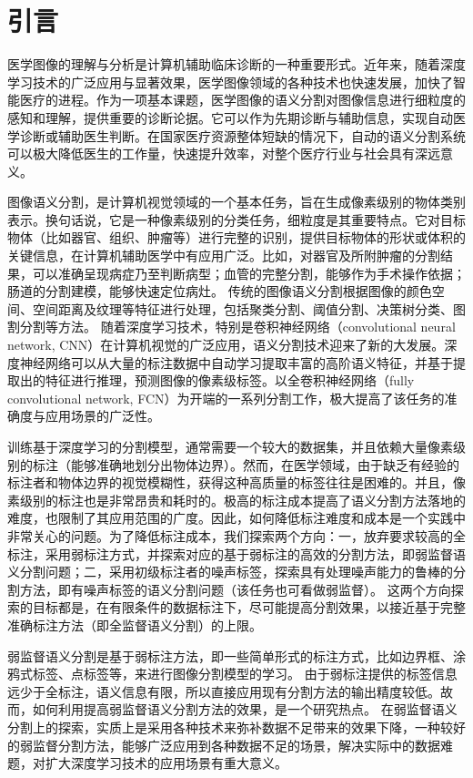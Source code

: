 \chapter{引言}

医学图像的理解与分析是计算机辅助临床诊断的一种重要形式。近年来，随着深度学习技术的广泛应用与显著效果，医学图像领域的各种技术也快速发展，加快了智能医疗的进程。作为一项基本课题，医学图像的语义分割对图像信息进行细粒度的感知和理解，提供重要的诊断论据。它可以作为先期诊断与辅助信息，实现自动医学诊断或辅助医生判断。在国家医疗资源整体短缺的情况下，自动的语义分割系统可以极大降低医生的工作量，快速提升效率，对整个医疗行业与社会具有深远意义。

图像语义分割，是计算机视觉领域的一个基本任务，旨在生成像素级别的物体类别表示。换句话说，它是一种像素级别的分类任务，细粒度是其重要特点。它对目标物体（比如器官、组织、肿瘤等）进行完整的识别，提供目标物体的形状或体积的关键信息，在计算机辅助医学中有应用广泛。比如，对器官及所附肿瘤的分割结果，可以准确呈现病症乃至判断病型；血管的完整分割，能够作为手术操作依据；肠道的分割建模，能够快速定位病灶。
传统的图像语义分割根据图像的颜色空间、空间距离及纹理等特征进行处理，包括聚类分割、阈值分割、决策树分类、图割分割等方法。
随着深度学习技术，特别是卷积神经网络（convolutional neural network, CNN）在计算机视觉的广泛应用，语义分割技术迎来了新的大发展。深度神经网络可以从大量的标注数据中自动学习提取丰富的高阶语义特征，并基于提取出的特征进行推理，预测图像的像素级标签。以全卷积神经网络（fully convolutional network, FCN）为开端的一系列分割工作，极大提高了该任务的准确度与应用场景的广泛性。

训练基于深度学习的分割模型，通常需要一个较大的数据集，并且依赖大量像素级别的标注（能够准确地划分出物体边界）。然而，在医学领域，由于缺乏有经验的标注者和物体边界的视觉模糊性，获得这种高质量的标签往往是困难的。并且，像素级别的标注也是非常昂贵和耗时的。极高的标注成本提高了语义分割方法落地的难度，也限制了其应用范围的广度。因此，如何降低标注难度和成本是一个实践中非常关心的问题。为了降低标注成本，我们探索两个方向：一，放弃要求较高的全标注，采用弱标注方式，并探索对应的基于弱标注的高效的分割方法，即弱监督语义分割问题；二，采用初级标注者的噪声标签，探索具有处理噪声能力的鲁棒的分割方法，即有噪声标签的语义分割问题（该任务也可看做弱监督）。
这两个方向探索的目标都是，在有限条件的数据标注下，尽可能提高分割效果，以接近基于完整准确标注方法（即全监督语义分割）的上限。

弱监督语义分割是基于弱标注方法，即一些简单形式的标注方式，比如边界框、涂鸦式标签、点标签等，来进行图像分割模型的学习。
由于弱标注提供的标签信息远少于全标注，语义信息有限，所以直接应用现有分割方法的输出精度较低。故而，如何利用提高弱监督语义分割方法的效果，是一个研究热点。
在弱监督语义分割上的探索，实质上是采用各种技术来弥补数据不足带来的效果下降，一种较好的弱监督分割方法，能够广泛应用到各种数据不足的场景，解决实际中的数据难题，对扩大深度学习技术的应用场景有重大意义。

